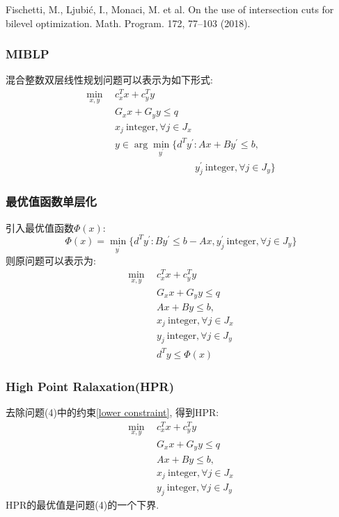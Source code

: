 \documentclass[10pt]{beamer}
\begin{document}
\begin{frame}
	Fischetti, M., Ljubić, I., Monaci, M. et al. On the use of intersection cuts for bilevel optimization. Math. Program. 172, 77–103 (2018). 
\end{frame}

\begin{frame}
	\frametitle{MIBLP}
	混合整数双层线性规划问题可以表示为如下形式:
	\begin{equation}
		\begin{aligned}
			\min_{x,y}~~&c_{x}^{T}x+c_{y}^{T}y \\
			&G_xx+G_yy \leq q  \\
			&x_{j}\mathrm{~integer}, \forall j\in J_{x}  \\
			&y\in\operatorname{arg}\operatorname*{min}_{y^{\prime}}\{d^{T}y^{\prime}:Ax+By^{\prime}\le b,\\
			&\qquad\qquad\qquad\qquad~ y_{j}^{\prime}\mathrm{~integer}, \forall j\in J_{y}\}
		\end{aligned}
	\end{equation}


\end{frame}

\begin{frame}
	\frametitle{最优值函数单层化}
	引入最优值函数$\Phi(x)$:
	\begin{equation}
		\Phi(x)=\operatorname*{min}_{y^{\prime}}\{d^{T}y^{\prime}:By^{\prime}\le b-Ax,y_{j}^{\prime}\mathrm{~integer}, \forall j\in J_{y}\}
	\end{equation}
	则原问题可以表示为:
	\begin{subequations}
		\begin{align}
			\min_{x,y}~~&c_{x}^{T}x+c_{y}^{T}y \\
			&G_xx+G_yy \leq q  \\
			&Ax+By\leq b,\\
			&x_{j}\mathrm{~integer}, \forall j\in J_{x}  \\
			&y_{j}\mathrm{~integer}, \forall j\in J_{y}  \\
			&d^{T}y\leq \Phi(x)	\label{lower constraint}
		\end{align}
	\end{subequations}

\end{frame}

\begin{frame}
	\frametitle{High Point Ralaxation(HPR)}
	去除问题(4)中的约束\eqref{lower constraint}, 得到HPR:
	\begin{subequations}
		\begin{align}
			\min_{x,y}~~&c_{x}^{T}x+c_{y}^{T}y \\
			&G_xx+G_yy \leq q  \\
			&Ax+By\leq b,\\
			&x_{j}\mathrm{~integer}, \forall j\in J_{x}  \\
			&y_{j}\mathrm{~integer}, \forall j\in J_{y}
		\end{align}
	\end{subequations}
	HPR的最优值是问题(4)的一个下界.
\end{frame}
\end{document}
